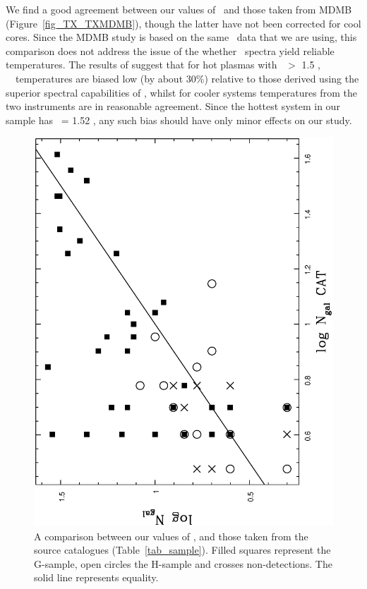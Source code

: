 \documentclass[usenatbib]{mn2e}
\begin{document}
We find a good agreement between our values of \TX\ and those taken from
MDMB (Figure~\ref{fig_TX_TXMDMB}), though the latter have not been corrected for
cool cores. Since the MDMB study is based on the same \ROSAT\ data that we are
using, this comparison does not address the issue of the whether \ROSAT\ spectra
yield reliable temperatures.  The results of \citet{hwang99} suggest that for hot
plasmas with \TX\ $>$ 1.5 \kev, \ROSAT\ \PSPC\ temperatures are biased low (by
about 30\%) relative to those derived using the superior spectral capabilities of
\ASCA, whilst for cooler systems temperatures from the two instruments are in
reasonable agreement. Since the hottest system in our sample has \TX\ = 1.52 \kev,
any such bias should have only minor effects on our study.

\begin{figure}
  \begin{minipage}{241pt} 

    \includegraphics[height=\linewidth,angle=270]{fig_06.ps}
    \caption{A comparison between our values of \Ngal, and those taken from the
             source catalogues (Table~\ref{tab_sample}).  Filled squares
             represent the G-sample, open circles the H-sample and crosses
             non-detections.  The solid line represents equality.}
    \label{fig_Ngal_Ngalcat}


\end{minipage}
\end{figure}
\end{document}

